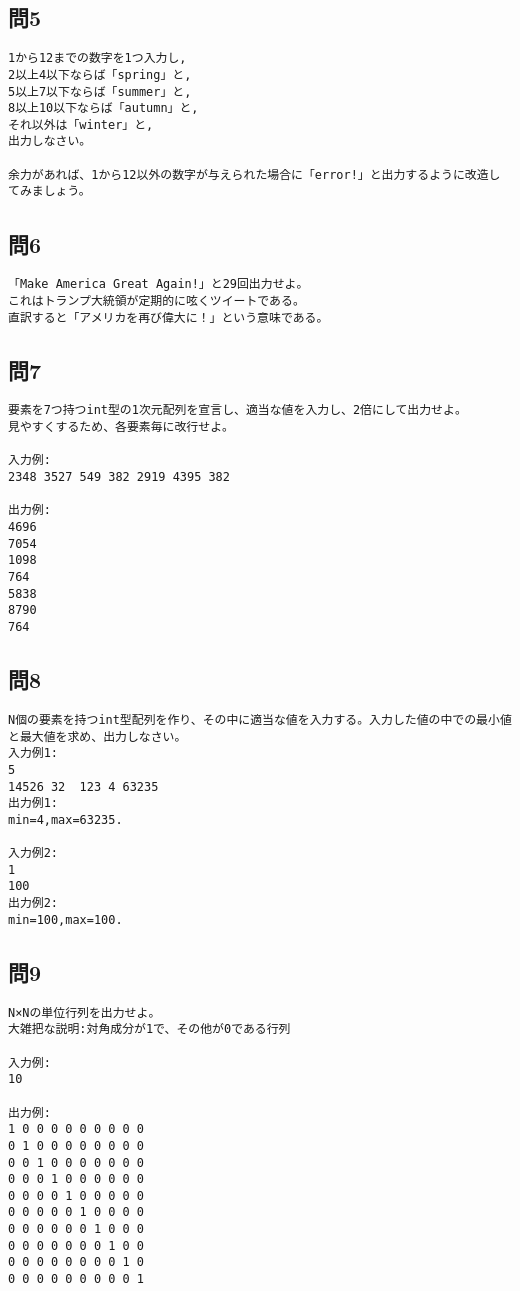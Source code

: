 \subsection{問5}
\begin{verbatim}
1から12までの数字を1つ入力し,
2以上4以下ならば「spring」と,
5以上7以下ならば「summer」と,
8以上10以下ならば「autumn」と,
それ以外は「winter」と,
出力しなさい。

余力があれば、1から12以外の数字が与えられた場合に「error!」と出力するように改造してみましょう。
\end{verbatim}

\subsection{問6}
\begin{verbatim}
「Make America Great Again!」と29回出力せよ。
これはトランプ大統領が定期的に呟くツイートである。
直訳すると「アメリカを再び偉大に！」という意味である。
\end{verbatim}

\subsection{問7}
\begin{verbatim}
要素を7つ持つint型の1次元配列を宣言し、適当な値を入力し、2倍にして出力せよ。
見やすくするため、各要素毎に改行せよ。

入力例:
2348 3527 549 382 2919 4395 382

出力例:
4696
7054
1098
764
5838
8790
764
\end{verbatim}

\subsection{問8}
\begin{verbatim}
N個の要素を持つint型配列を作り、その中に適当な値を入力する。入力した値の中での最小値と最大値を求め、出力しなさい。
入力例1:
5
14526 32  123 4 63235
出力例1:
min=4,max=63235.

入力例2:
1
100
出力例2:
min=100,max=100.
\end{verbatim}

\subsection{問9}
\begin{verbatim}
N×Nの単位行列を出力せよ。
大雑把な説明:対角成分が1で、その他が0である行列

入力例:
10

出力例:
1 0 0 0 0 0 0 0 0 0
0 1 0 0 0 0 0 0 0 0
0 0 1 0 0 0 0 0 0 0
0 0 0 1 0 0 0 0 0 0
0 0 0 0 1 0 0 0 0 0
0 0 0 0 0 1 0 0 0 0
0 0 0 0 0 0 1 0 0 0
0 0 0 0 0 0 0 1 0 0
0 0 0 0 0 0 0 0 1 0
0 0 0 0 0 0 0 0 0 1
\end{verbatim}

